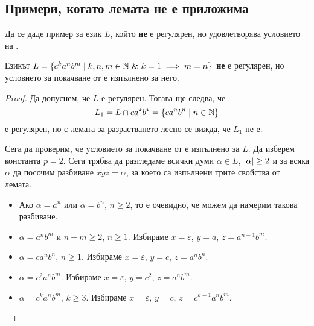 \subsection*{Примери, когато лемата не е  приложима}

\begin{problem}
  Да се даде пример за език $L$, който {\bf не} е регулярен, но удовлетворява
  условието на .
\end{problem}

\begin{example}
  Езикът $L = \{c^ka^nb^m\mid k,n,m \in \Nat\ \&\ k = 1\implies m = n\}$
  {\bf не} е регулярен, но условието за покачване от  е изпълнено за него.
\end{example}
\begin{proof}
  Да допуснем, че $L$ е регулярен.
  Тогава ще следва, че 
  \[L_1 = L\cap ca^\star b^\star = \{ca^nb^n \mid n\in\mathbb{N}\}\]
  е регулярен,
  но с лемата за разрастването лесно се вижда, че $L_1$ не е.

  Сега да проверим, че условието за покачване от  е изпълнено за $L$.
  Да изберем константа $p = 2$.
  Сега трябва да разгледаме всички думи $\alpha \in L$, $\lvert{\alpha}\rvert \geq 2$
  и за всяка $\alpha$ да посочим разбиване $xyz = \alpha$, за което са изпълнени трите свойства от лемата.

  \begin{itemize}
  \item
    Ако $\alpha = a^n$ или $\alpha = b^n$, $n\geq 2$, то е  очевидно, че можем да
    намерим такова разбиване.
  \item
    $\alpha = a^nb^m$ и $n+m \geq 2$, $n \geq 1$.
    Избираме $x = \varepsilon$, $y = a$, $z = a^{n-1}b^m$.
  \item
    $\alpha = ca^nb^n$, $n\geq 1$.
    Избираме $x = \varepsilon$, $y = c$, $z = a^nb^n$.
  \item
    $\alpha = c^2a^nb^m$. 
    Избираме $x = \varepsilon$, $y = c^2$, $z = a^nb^m$.
  \item
    $\alpha = c^ka^nb^m$, $k \geq 3$.
    Избираме $x = \varepsilon$, $y = c$, $z = c^{k-1}a^nb^m$.
  \end{itemize}
\end{proof}

